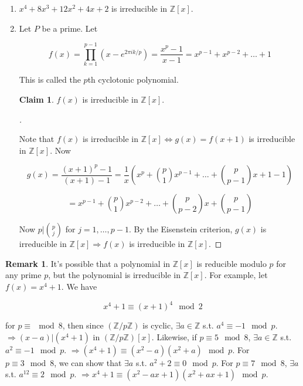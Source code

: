 \documentclass[12pt]{article}
\theoremstyle{definition}
\newtheorem{rem}{Remark}
\newtheorem*{clm}{Claim}
\newenvironment{proofs}[1][\proofname]{%
  \begin{proof}[#1]$ $\par\nobreak\ignorespaces
}{%
  \end{proof}
}
\begin{document}
\begin{ex}
	\begin{enumerate}
		\item $x^4 + 8x^3 + 12x^2 + 4 x + 2$ is irreducible in $\mathbb{Z}[x]$.
		\item Let $P$ be a prime. Let

		      $$f(x) = \prod_{k = 1}^{p - 1} (x - e^{2 \pi i k/p}) = \frac{x^p - 1}{x - 1} = x^{p - 1} + x^{p - 2} + \hdots + 1$$

		      This is called the $p$th cyclotonic polynomial.

		      \begin{clm}
			      $f(x)$ is irreducible in $\mathbb{Z}[x]$.
		      \end{clm}

		      \begin{proofs}
			      Note that $f(x)$ is irreducible in $\mathbb{Z}[x] \Leftrightarrow g(x) = f(x + 1)$ is irreducible in $\mathbb{Z}[x]$. Now

			      $$g(x) = \frac{(x+1)^p - 1}{(x+1) - 1} = \frac{1}{x} (x^p + \binom{p}{1} x^{p - 1} + \hdots + \binom{p}{p - 1}x + 1  - 1)$$

			      $$ = x^{p - 1} + \binom{p}{1} x^{p - 2} + \hdots + \binom{p}{p - 2} x + \binom{p}{p - 1}$$

			      Now $p|\binom{p}{j}$ for $j = 1, \hdots, p - 1$. By the Eisenstein criterion, $g(x)$ is irreducible in $\mathbb{Z}[x] \Rightarrow f(x)$ is irreducible in $\mathbb{Z}[x]$.
		      \end{proofs}
	\end{enumerate}
\end{ex}

\begin{rem}
	It's possible that a polynomial in $\mathbb{Z}[x]$ is reducible modulo $p$ for any prime $p$, but the polynomial is irreducible in $\mathbb{Z}[x]$. For example, let $f(x) = x^4 + 1$. We have

	$$x^4 + 1 \equiv (x+1)^4 \mod 2$$

	for $p \equiv \mod 8$, then since $(\mathbb{Z}/p\mathbb{Z})$ is cyclic, $\exists a \in \mathbb{Z}$ s.t. $a^4 \equiv -1 \mod p$. $\Rightarrow (x - a) | (x^4 + 1)$ in $(\mathbb{Z}/p\mathbb{Z})[x]$. Likewise, if $p \equiv 5 \mod 8$, $\exists a \in \mathbb{Z}$ s.t. $a^2 \equiv -1 \mod p$. $\Rightarrow (x^4 + 1) \equiv (x^2 - a)(x^2 + a) \mod p$. For $p \equiv 3 \mod 8$, we can show that $\exists a$ s.t. $a^2 + 2 \equiv 0 \mod p$. For $p \equiv 7 \mod 8$, $\exists a $ s.t. $a^{12} \equiv 2 \mod p$. $\Rightarrow x^4 + 1 \equiv (x^2 - ax + 1)(x^2 + ax + 1) \mod p$.
\end{rem}
\end{document}
